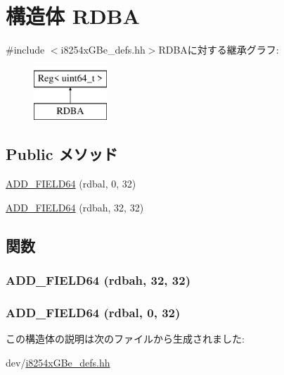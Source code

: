 \hypertarget{structiGbReg_1_1Regs_1_1RDBA}{
\section{構造体 RDBA}
\label{structiGbReg_1_1Regs_1_1RDBA}
}


{\ttfamily \#include $<$i8254xGBe\_\-defs.hh$>$}RDBAに対する継承グラフ:\begin{figure}[H]
\begin{center}
\leavevmode
\includegraphics[height=2cm]{structiGbReg_1_1Regs_1_1RDBA}
\end{center}
\end{figure}
\subsection*{Public メソッド}
\begin{DoxyCompactItemize}
\item 
\hyperlink{structiGbReg_1_1Regs_1_1RDBA_a9a631312a6ed5c1fedeeefd5fd25033b}{ADD\_\-FIELD64} (rdbal, 0, 32)
\item 
\hyperlink{structiGbReg_1_1Regs_1_1RDBA_a4edbb4b98d299f8a90e3a936fc7a2cb1}{ADD\_\-FIELD64} (rdbah, 32, 32)
\end{DoxyCompactItemize}


\subsection{関数}
\hypertarget{structiGbReg_1_1Regs_1_1RDBA_a4edbb4b98d299f8a90e3a936fc7a2cb1}{
\subsubsection[{ADD\_\-FIELD64}]{\setlength{\rightskip}{0pt plus 5cm}ADD\_\-FIELD64 (rdbah, \/  32, \/  32)}}
\label{structiGbReg_1_1Regs_1_1RDBA_a4edbb4b98d299f8a90e3a936fc7a2cb1}
\hypertarget{structiGbReg_1_1Regs_1_1RDBA_a9a631312a6ed5c1fedeeefd5fd25033b}{
\subsubsection[{ADD\_\-FIELD64}]{\setlength{\rightskip}{0pt plus 5cm}ADD\_\-FIELD64 (rdbal, \/  0, \/  32)}}
\label{structiGbReg_1_1Regs_1_1RDBA_a9a631312a6ed5c1fedeeefd5fd25033b}


この構造体の説明は次のファイルから生成されました:\begin{DoxyCompactItemize}
\item 
dev/\hyperlink{i8254xGBe__defs_8hh}{i8254xGBe\_\-defs.hh}\end{DoxyCompactItemize}
